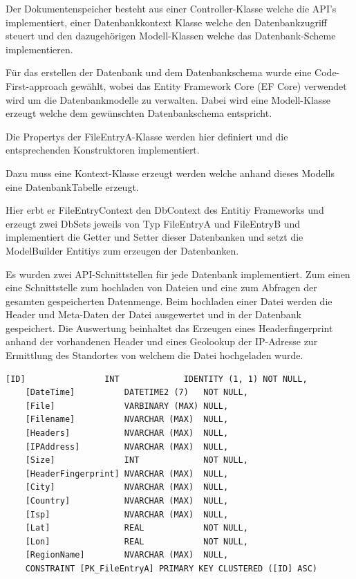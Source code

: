 \documentclass[
    fontsize=12pt,
    headings=small,
    parskip=half,           %
    bibliography=totoc,
    numbers=noenddot,       %
    open=any,               %
    ]{scrreprt}
\begin{document}
Der Dokumentenspeicher besteht aus einer Controller-Klasse welche die API's implementiert, einer Datenbankkontext Klasse welche den Datenbankzugriff steuert und den dazugehörigen Modell-Klassen welche das Datenbank-Scheme implementieren. 

Für das erstellen der Datenbank und dem Datenbankschema wurde eine Code-First-approach gewählt, wobei das Entity Framework Core (EF Core) verwendet wird um die Datenbankmodelle zu verwalten. 
Dabei wird eine Modell-Klasse erzeugt welche dem gewünschten Datenbankschema entspricht.



Die Propertys der FileEntryA-Klasse werden hier definiert und die entsprechenden Konstruktoren implementiert. 

Dazu muss eine Kontext-Klasse erzeugt werden welche anhand dieses Modells eine DatenbankTabelle erzeugt. 



Hier erbt er FileEntryContext den DbContext des Entitiy Frameworks und erzeugt zwei DbSets jeweils von Typ FileEntryA und FileEntryB und implementiert die Getter und Setter dieser Datenbanken und setzt die ModelBuilder Entitiys zum erzeugen der Datenbanken.

Es wurden zwei API-Schnittstellen für jede Datenbank implementiert. Zum einen eine Schnittstelle zum hochladen von Dateien und eine zum Abfragen der gesamten gespeicherten Datenmenge. Beim hochladen einer Datei werden die Header und Meta-Daten der Datei ausgewertet und in der Datenbank gespeichert. Die Auswertung beinhaltet das Erzeugen eines Headerfingerprint anhand der vorhandenen Header und eines Geolookup der IP-Adresse zur Ermittlung des Standortes von welchem die Datei hochgeladen wurde.

\begin{lstlisting}[float,caption={Datenbank Schema für das Set A},label={lst:ggt}]
[ID]                INT             IDENTITY (1, 1) NOT NULL,
    [DateTime]          DATETIME2 (7)   NOT NULL,
    [File]              VARBINARY (MAX) NULL,
    [Filename]          NVARCHAR (MAX)  NULL,
    [Headers]           NVARCHAR (MAX)  NULL,
    [IPAddress]         NVARCHAR (MAX)  NULL,
    [Size]              INT             NOT NULL,
    [HeaderFingerprint] NVARCHAR (MAX)  NULL,
    [City]              NVARCHAR (MAX)  NULL,
    [Country]           NVARCHAR (MAX)  NULL,
    [Isp]               NVARCHAR (MAX)  NULL,
    [Lat]               REAL            NOT NULL,
    [Lon]               REAL            NOT NULL,
    [RegionName]        NVARCHAR (MAX)  NULL,
    CONSTRAINT [PK_FileEntryA] PRIMARY KEY CLUSTERED ([ID] ASC)
\end{lstlisting}
\end{document}
